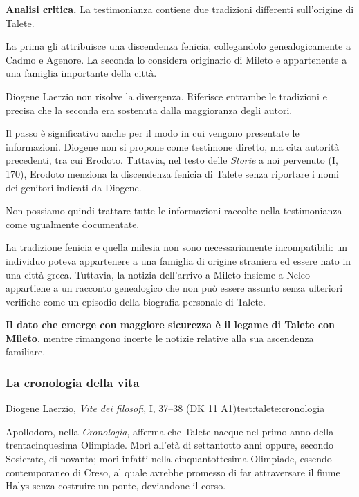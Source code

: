 
\noindent\textbf{Analisi critica.}
La testimonianza contiene due tradizioni differenti sull'origine di Talete.

La prima gli attribuisce una discendenza fenicia, collegandolo genealogicamente a Cadmo e Agenore. La seconda lo considera originario di Mileto e appartenente a una famiglia importante della città.

Diogene Laerzio non risolve la divergenza. Riferisce entrambe le tradizioni e precisa che la seconda era sostenuta dalla maggioranza degli autori.

Il passo è significativo anche per il modo in cui vengono presentate le informazioni. Diogene non si propone come testimone diretto, ma cita autorità precedenti, tra cui Erodoto. Tuttavia, nel testo delle \emph{Storie} a noi pervenuto (I, 170), Erodoto menziona la discendenza fenicia di Talete senza riportare i nomi dei genitori indicati da Diogene.

Non possiamo quindi trattare tutte le informazioni raccolte nella testimonianza come ugualmente documentate.

La tradizione fenicia e quella milesia non sono necessariamente incompatibili: un individuo poteva appartenere a una famiglia di origine straniera ed essere nato in una città greca. Tuttavia, la notizia dell'arrivo a Mileto insieme a Neleo appartiene a un racconto genealogico che non può essere assunto senza ulteriori verifiche come un episodio della biografia personale di Talete.

\textbf{Il dato che emerge con maggiore sicurezza è il legame di Talete con Mileto}, mentre rimangono incerte le notizie relative alla sua ascendenza familiare.

\subsubsection{La cronologia della vita}

\begin{testimonianza}{Diogene Laerzio, \emph{Vite dei filosofi}, I, 37--38 (DK 11 A1)}{test:talete:cronologia}
\smallskip
{}\par
Apollodoro, nella \emph{Cronologia}, afferma che Talete nacque nel primo anno della trentacinquesima Olimpiade. Morì all'età di settantotto anni oppure, secondo Sosicrate, di novanta; morì infatti nella cinquantottesima Olimpiade, essendo contemporaneo di Creso, al quale avrebbe promesso di far attraversare il fiume Halys senza costruire un ponte, deviandone il corso.
\end{testimonianza}

